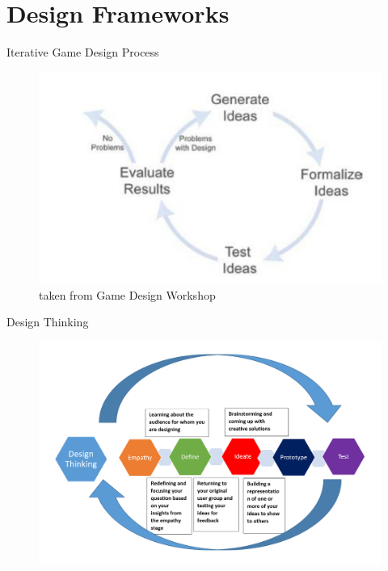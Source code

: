 \part{Design Frameworks}
\frame{\partpage}

\begin{frame}{Iterative Game Design Process}
	\begin{figure}
		\includegraphics[width=1.0\textwidth,height=0.7\textheight]{iterative_game_design}
		\caption{taken from Game Design Workshop}
		\label{fig:iter1}
	\end{figure}
\end{frame}


\begin{frame}{Design Thinking}
	\begin{figure}
		\includegraphics[width=1.0\textwidth, height=0.7\textheight]{design_thinking}
		\label{fig:design_thinking1}
	\end{figure}	
\end{frame}

